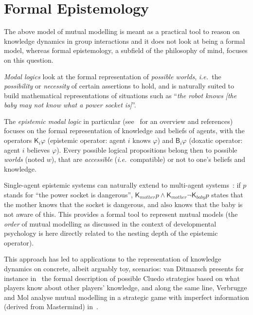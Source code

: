 \documentclass{sig-alternate}
\newcommand{\ie}{{\textit{i.e.~}}}
\begin{document}


\section{Formal Epistemology}
\label{formal-epistemology}

The above model of mutual modelling is meant as a practical tool to reason on
knowledge dynamics in group interactions and it does not look at being a formal
model, whereas formal epistemology, a subfield of the philosophy of mind,
focuses on this question.

\emph{Modal logics} look at the formal representation of \emph{possible
worlds}, \ie the \emph{possibility} or \emph{necessity} of certain assertions
to hold, and is naturally suited to build mathematical representations of
situations such as ``\emph{the robot knows [the baby may not know what a power
socket is]}''.

The \emph{epistemic modal logic} in particular (see~\cite{hendricks2008epistemic} for an
overview and references) focuses on the formal representation of
knowledge and beliefs of agents, with the operators $\mathsf{K}_{i}\varphi$
(epistemic operator: agent $i$ knows $\varphi$) and $\mathsf{B}_{i}\varphi$
(doxatic operator: agent $i$ believes $\varphi$). Every possible logical
propositions belong then to possible \emph{worlds} (noted $w$), that are
\emph{accessible} (\ie compatible) or not to one's beliefs and knowledge.

Single-agent epistemic systems can naturally extend to multi-agent systems~\cite[chapt.
4]{fagin1995reasoning}: if $p$ stands for ``the power socket is dangerous'',
$\mathsf{K}_{mother}p \wedge \mathsf{K}_{mother}\neg\mathsf{K}_{baby}p$ states
that the mother knows that the socket is dangerous, and also knows that the baby
is not aware of this. This provides a formal tool to represent mutual models
(the \emph{order} of mutual modelling as discussed in the context of
developmental psychology is here directly
related to the nesting depth of the epistemic operator).

This approach has led to applications to the representation of knowledge
dynamics on concrete, albeit arguably toy, scenarios: van Ditmarsch presents for
instance in~\cite{ditmarsch2002description} the formal description of possible
Cluedo strategies based on what players know about other players' knowledge, and
along the same line, Verbrugge and Mol analyse mutual modelling in a strategic
game with imperfect information (derived from Mastermind)
in~\cite{verbrugge2008learning}.
\end{document}
